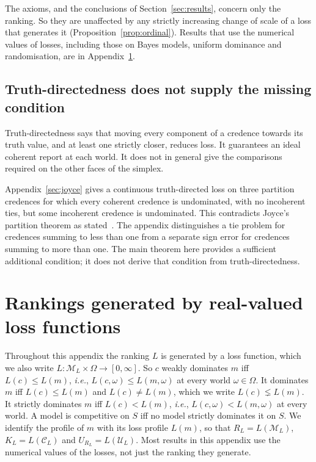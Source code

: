 \documentclass[11pt]{article}
\theoremstyle{definition}
\theoremstyle{remark}
\newcommand{\M}{\mathcal M}
\newcommand{\C}{\mathcal C}
\newcommand{\U}{\mathcal U}
\begin{document}
The axioms, and the conclusions of Section~\ref{sec:results}, concern only the ranking. So they are unaffected by any strictly increasing change of scale of a loss that generates it (Proposition~\ref{prop:ordinal}). Results that use the numerical values of losses, including those on Bayes models, uniform dominance and randomisation, are in Appendix~\ref{sec:real}.

\subsection{Truth-directedness does not supply the missing condition}
Truth-directedness says that moving every component of a credence towards its truth value, and at least one strictly closer, reduces loss. It guarantees an ideal coherent report at each world. It does not in general give the comparisons required on the other faces of the simplex.

Appendix~\ref{sec:joyce} gives a continuous truth-directed loss on three partition credences for which every coherent credence is undominated, with no incoherent ties, but some incoherent credence is undominated. This contradicts Joyce's partition theorem as stated~\cite[Theorem~2]{Joyce}. The appendix distinguishes a tie problem for credences summing to less than one from a separate sign error for credences summing to more than one. The main theorem here provides a sufficient additional condition; it does not derive that condition from truth-directedness.


\appendix
\section{Rankings generated by real-valued loss functions}\label{sec:real}
Throughout this appendix the ranking $L$ is generated by a loss function, which we also write $L:\M_L\times\Omega\to[0,\infty]$. So $c$ weakly dominates $m$ iff $L(c)\le L(m)$, \textit{i.e.}, $L(c,\omega)\le L(m,\omega)$ at every world $\omega\in\Omega$. It dominates $m$ iff $L(c)\le L(m)$ and $L(c)\neq L(m)$, which we write $L(c)\lneq L(m)$. It strictly dominates $m$ iff $L(c)<L(m)$, \textit{i.e.}, $L(c,\omega)<L(m,\omega)$ at every world. A model is competitive on $S$ iff no model strictly dominates it on $S$. We identify the profile of $m$ with its loss profile $L(m)$, so that $R_L=L(\M_L)$, $K_L=L(\C_L)$ and $U_{R_L}=L(\U_L)$. Most results in this appendix use the numerical values of the losses, not just the ranking they generate.
\end{document}
